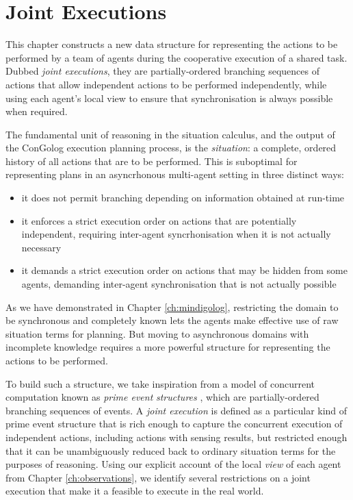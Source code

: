 

\chapter{Joint Executions}

\label{ch:jointexec}

This chapter constructs a new data structure for representing the
actions to be performed by a team of agents during the cooperative
execution of a shared task. Dubbed \emph{joint executions}, they are
partially-ordered branching sequences of actions that allow independent
actions to be performed independently, while using each agent's local
view to ensure that synchronisation is always possible when required.

The fundamental unit of reasoning in the situation calculus, and the
output of the ConGolog execution planning process, is the \emph{situation}:
a complete, ordered history of all actions that are to be performed.
This is suboptimal for representing plans in an asyncrhonous multi-agent
setting in three distinct ways:

\begin{itemize}
\item it does not permit branching depending on information obtained at
run-time 
\item it enforces a strict execution order on actions that are potentially
independent, requiring inter-agent syncrhonisation when it is not
actually necessary 
\item it demands a strict execution order on actions that may be hidden
from some agents, demanding inter-agent synchronisation that is not
actually possible 
\end{itemize}
As we have demonstrated in Chapter \ref{ch:mindigolog}, restricting
the domain to be synchronous and completely known lets the agents
make effective use of raw situation terms for planning. But moving
to asynchronous domains with incomplete knowledge requires a more
powerful structure for representing the actions to be performed.

To build such a structure, we take inspiration from a model of concurrent
computation known as \emph{prime event} \emph{structures} \citep{npw79event_structures},
which are partially-ordered branching sequences of events. A \emph{joint
execution} is defined as a particular kind of prime event structure
that is rich enough to capture the concurrent execution of independent
actions, including actions with sensing results, but restricted enough
that it can be unambiguously reduced back to ordinary situation terms
for the purposes of reasoning. Using our explicit account of the local
\emph{view} of each agent from Chapter \ref{ch:observations}, we
identify several restrictions on a joint execution that make it a
feasible to execute in the real world.

